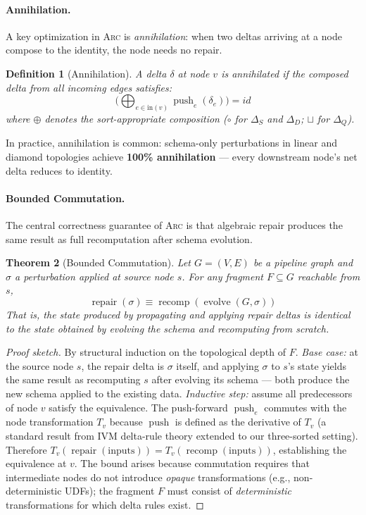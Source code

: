 \documentclass[sigplan,screen,nonacm]{acmart}
\newcommand{\arc}{\textsc{Arc}\xspace}
\newcommand{\DeltaS}{\Delta_{\!S}}
\newcommand{\DeltaD}{\Delta_{\!D}}
\newcommand{\DeltaQ}{\Delta_{\!Q}}
\newcommand{\compose}{\mathbin{\circ}}
\newcommand{\push}{\operatorname{push}}
\newcommand{\evolve}{\operatorname{evolve}}
\newcommand{\repair}{\operatorname{repair}}
\newcommand{\recomp}{\operatorname{recomp}}
\newtheorem{theorem}{Theorem}
\newtheorem{definition}[theorem]{Definition}
\begin{document}
\paragraph{Annihilation.}
A key optimization in \arc is \emph{annihilation}: when two deltas arriving
at a node compose to the identity, the node needs no repair.

\begin{definition}[Annihilation]
A delta $\delta$ at node $v$ is \emph{annihilated} if the composed delta
from all incoming edges satisfies:
\[
  \bigl(\bigoplus_{e \in \mathrm{in}(v)} \push_e(\delta_e)\bigr)
  = \mathit{id}
\]
where $\oplus$ denotes the sort-appropriate composition ($\compose$ for
$\DeltaS$ and $\DeltaD$; $\sqcup$ for $\DeltaQ$).
\end{definition}

In practice, annihilation is common: schema-only perturbations in linear
and diamond topologies achieve \textbf{100\% annihilation} --- every
downstream node's net delta reduces to identity.

\paragraph{Bounded Commutation.}
The central correctness guarantee of \arc is that algebraic repair produces
the same result as full recomputation after schema evolution.

\begin{theorem}[Bounded Commutation]\label{thm:commutation}
Let $G = (V, E)$ be a pipeline graph and $\sigma$ a perturbation applied at
source node $s$.  For any fragment $F \subseteq G$ reachable from $s$,
\[
  \repair(\sigma) \equiv \recomp(\evolve(G, \sigma))
\]
That is, the state produced by propagating and applying repair deltas is
identical to the state obtained by evolving the schema and recomputing
from scratch.
\end{theorem}

\begin{proof}[Proof sketch]
By structural induction on the topological depth of $F$.  \emph{Base case:}
at the source node $s$, the repair delta is $\sigma$ itself, and applying
$\sigma$ to $s$'s state yields the same result as recomputing $s$ after
evolving its schema --- both produce the new schema applied to the existing
data.  \emph{Inductive step:} assume all predecessors of node $v$ satisfy
the equivalence.  The push-forward $\push_e$ commutes with the node
transformation $T_v$ because $\push$ is defined as the derivative of $T_v$
(a standard result from IVM delta-rule theory extended to our three-sorted
setting).  Therefore
$T_v(\repair(\mathrm{inputs})) = T_v(\recomp(\mathrm{inputs}))$,
establishing the equivalence at $v$.  The bound arises because commutation
requires that intermediate nodes do not introduce \emph{opaque}
transformations (e.g., non-deterministic UDFs); the fragment $F$ must
consist of \emph{deterministic} transformations for which delta rules
exist.
\end{proof}
\end{document}
